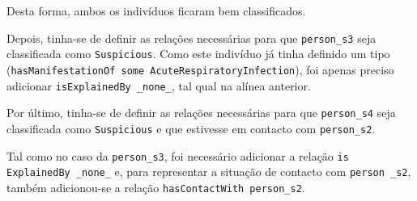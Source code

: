Desta forma, ambos os indivíduos ficaram bem classificados.

Depois, tinha-se de definir as relações necessárias para que \texttt{person\_s3} seja classificada como \texttt{Suspicious}. Como este indivíduo já tinha definido um tipo (\texttt{hasManifestationOf some AcuteRespiratoryInfection}), foi apenas preciso adicionar \texttt{isExplainedBy \_none\_}, tal qual na alínea anterior.

Por último, tinha-se de definir as relações necessárias para que \texttt{person\_s4} seja classificada como \texttt{Suspicious} e que estivesse em contacto com \texttt{person\_s2}.

Tal como no caso da \texttt{person\_s3}, foi necessário adicionar a relação \texttt{is ExplainedBy \_none\_} e, para representar a situação de contacto com \texttt{person \_s2}, também adicionou-se a relação \texttt{hasContactWith person\_s2}.